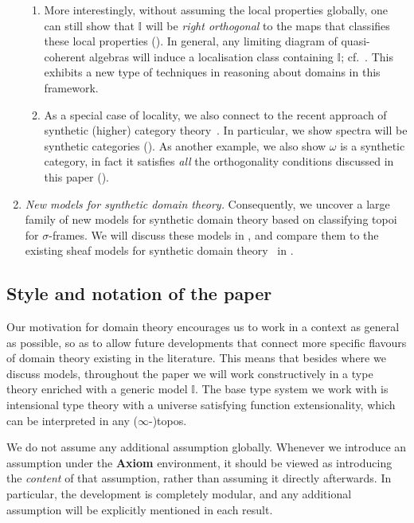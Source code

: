 \documentclass[a4paper,12pt]{amsart}
\theoremstyle{definition}
\newcommand{\mbb}[1]{\mathbb{#1}}
\newcommand{\I}{\mbb I}
\begin{document}
\begin{enumerate}[leftmargin=*]
\begin{enumerate}
    \item  More interestingly, without assuming the local properties globally, one can still show that $\I$ will be \emph{right orthogonal} to the maps that classifies these local properties (). In general, any limiting diagram of quasi-coherent algebras will induce a localisation class containing $\I$; cf.\ . This exhibits a new type of techniques in reasoning about domains in this framework.
    
    \item As a special case of locality, we also connect to the recent approach of synthetic (higher) category theory~\cite{riehl2017type,buchholtz2021synthetic,gratzer2024directed}. In particular, we show spectra will be synthetic categories (). As another example, we also show $\omega$ is a synthetic category, in fact it satisfies \emph{all} the orthogonality conditions discussed in this paper (). 
  \end{enumerate}

  \item \emph{New models for synthetic domain theory.} Consequently, we uncover a large family of new models for synthetic domain theory based on classifying topoi for $\sigma$-frames. We will discuss these models in , and compare them to the existing sheaf models for synthetic domain theory~\cite{FIORE1997151} in .
\end{enumerate}






\subsection{Style and notation of the paper}

Our motivation for domain theory encourages us to work in a context as general as possible, so as to allow future developments that connect more specific flavours of domain theory existing in the literature. This means that besides  where we discuss models, throughout the paper we will work constructively in a type theory enriched with a generic model $\I$. The base type system we work with is intensional type theory with a universe satisfying function extensionality, which can be interpreted in any ($\infty$-)topos. 

We do not assume any additional assumption globally. Whenever we introduce an assumption under the \textbf{Axiom} environment, it should be viewed as introducing the \emph{content} of that assumption, rather than assuming it directly afterwards. In particular, the development is completely modular, and any additional assumption will be explicitly mentioned in each result.
\end{document}
